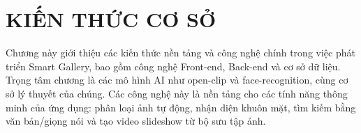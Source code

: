 \chapter{KIẾN THỨC CƠ SỞ}
Chương này giới thiệu các kiến thức nền tảng và công nghệ chính trong việc phát triển Smart Gallery, bao gồm công nghệ Front-end, Back-end và cơ sở dữ liệu. Trọng tâm chương là các mô hình AI như open-clip và face-recognition, cùng cơ sở lý thuyết của chúng. Các công nghệ này là nền tảng cho các tính năng thông minh của ứng dụng: phân loại ảnh tự động, nhận diện khuôn mặt, tìm kiếm bằng văn bản/giọng nói và tạo video slideshow từ bộ sưu tập ảnh.














